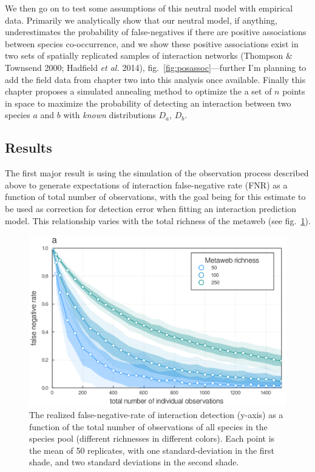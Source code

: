 \documentclass[11pt]{article}
\makeatletter
\def\maxwidth{\ifdim\Gin@nat@width>\linewidth\linewidth
\else\Gin@nat@width\fi}
\let\Oldincludegraphics\includegraphics
\renewcommand{\includegraphics}[1]{\Oldincludegraphics[width=\maxwidth]{#1}}
\makeatother
\begin{document}
We then go on to test some assumptions of this neutral model with
empirical data. Primarily we analytically show that our neutral model,
if anything, underestimates the probability of false-negatives if there
are positive associations between species co-occurrence, and we show
these positive associations exist in two sets of spatially replicated
samples of interaction networks (Thompson \& Townsend 2000; Hadfield
\emph{et al.} 2014), fig.~\ref{fig:posassoc}---further I'm planning to
add the field data from chapter two into this analysis once available.
Finally this chapter proposes a simulated annealing method to optimize
the a set of \(n\) points in space to maximize the probability of
detecting an interaction between two species \(a\) and \(b\) with
\emph{known} distributions \(D_a\), \(D_b\).

\hypertarget{results}{%
\subsection{Results}\label{results}}

The first major result is using the simulation of the observation
process described above to generate expectations of interaction
false-negative rate (FNR) as a function of total number of observations,
with the goal being for this estimate to be used as correction for
detection error when fitting an interaction prediction model. This
relationship varies with the total richness of the metaweb (see
fig.~\ref{fig:fnr}).

\begin{figure}
\hypertarget{fig:fnr}{%
\centering
\includegraphics{./figures/ch2_fnr.png}
\caption{The realized false-negative-rate of interaction detection
(y-axis) as a function of the total number of observations of all
species in the species pool (different richnesses in different colors).
Each point is the mean of 50 replicates, with one standard-deviation in
the first shade, and two standard deviations in the second
shade.}\label{fig:fnr}
}
\end{figure}
\end{document}
